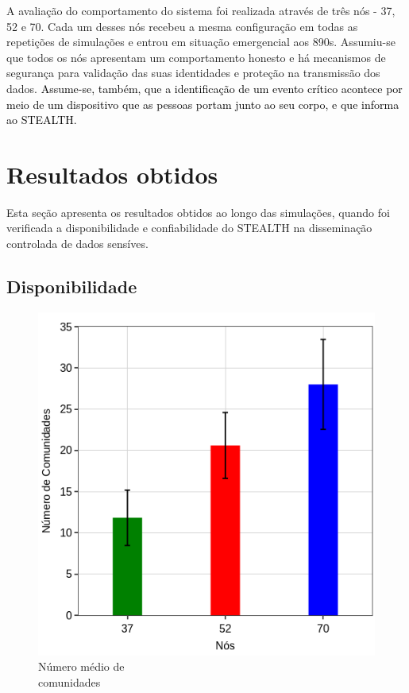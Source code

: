 \documentclass[12pt]{article}
\newcommand{\rev}[1]{\textcolor{black}{{#1}}}
\begin{document}
A avaliação do comportamento do sistema foi realizada através de três nós - 37, 52 e 70.
Cada um desses nós recebeu
a mesma configuração
em todas as repetições de simulações e
entrou em situação emergencial aos 890s.
Assumiu-se que todos os nós apresentam um comportamento honesto
e há mecanismos de segurança para validação das suas identidades e proteção na transmissão dos dados. \rev{Assume-se, também, que a identificação de um evento crítico 
acontece 
por meio de um dispositivo que as pessoas 
portam 
junto ao seu corpo, e que informa ao \mbox{STEALTH}.}




\section{Resultados obtidos}
\label{sec:results}

Esta seção apresenta os resultados obtidos ao longo das simulações, quando foi verificada a disponibilidade e confiabilidade do \mbox{STEALTH} na disseminação controlada de dados sensíves.

\subsection{Disponibilidade}

\begin{figure}
\centering
\includegraphics[width=.35\textwidth]{figures/coi_mean_performance_3_SBSEG19_v2.png}
\vspace{-0.5cm}
\caption[Número médio de comunidades]
{Número médio de \\ comunidades\endtabular}
\label{fig:coiEstabelecidas}
\end{figure}    
\end{document}
